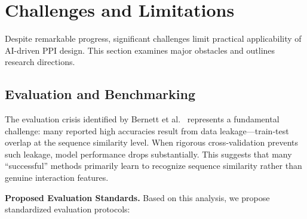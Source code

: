 \section{Challenges and Limitations}
\label{sec:challenges}

Despite remarkable progress, significant challenges limit practical applicability of AI-driven PPI design. This section examines major obstacles and outlines research directions.

\subsection{Evaluation and Benchmarking}

The evaluation crisis identified by Bernett et al.~\cite{bernett2024bias} represents a fundamental challenge: many reported high accuracies result from data leakage---train-test overlap at the sequence similarity level. When rigorous cross-validation prevents such leakage, model performance drops substantially. This suggests that many ``successful'' methods primarily learn to recognize sequence similarity rather than genuine interaction features.

\textbf{Proposed Evaluation Standards.} Based on this analysis, we propose standardized evaluation protocols:

